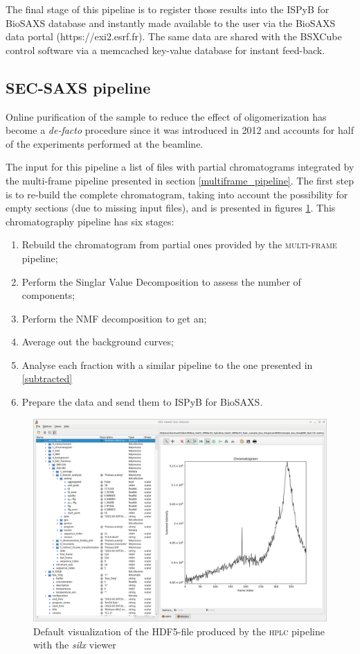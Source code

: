 \documentclass[preprint]{iucr}              %
\begin{document}
The final stage of this pipeline is to register those results into the ISPyB for BioSAXS \cite{ISPYBB} database and instantly made available to the user via the BioSAXS data portal (https://exi2.esrf.fr). 
The same data are shared with the BSXCube control software via a memcached key-value database for instant feed-back.

\subsection{SEC-SAXS pipeline}
Online purification of the sample to reduce the effect of oligomerization has become a \textit{de-facto} procedure
since it was introduced in 2012 \cite{SECPaper2012} and accounts for half of the experiments performed at the beamline.

The input for this pipeline a list of files with partial chromatograms integrated by the multi-frame pipeline presented in section \ref{multiframe_pipeline}.
The first step is to re-build the complete chromatogram, taking into account the possibility for empty sections (due to missing input files), and is presented in figures \ref{hplc}.
This chromatography pipeline has six stages:
\begin{enumerate}
    \item Rebuild the chromatogram from partial ones provided by the \textsc{multi-frame} pipeline;
    \item Perform the Singlar Value Decomposition to assess the number of components;
    \item Perform the NMF decomposition to get an;
    \item Average out the background curves;
    \item Analyse each fraction with a similar pipeline to the one presented in \ref{subtracted}
    \item Prepare the data and send them to ISPyB for BioSAXS.
\end{enumerate}

\begin{figure}
\label{hplc}
\begin{center}
\includegraphics{hplc}
\caption{Default visualization of the HDF5-file produced by the \textsc{hplc} pipeline with the \textit{silx} viewer}
\end{center}
\end{figure}
\end{document}
